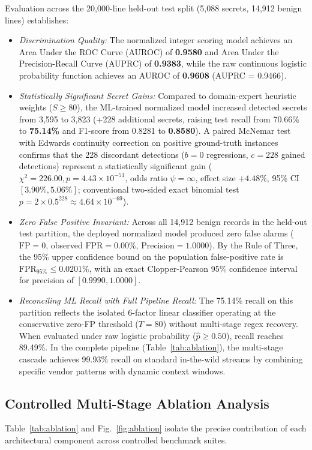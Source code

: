\documentclass[conference]{IEEEtran}
\begin{document}
Evaluation across the 20,000-line held-out test split (5,088 secrets, 14,912 benign lines) establishes:
\begin{itemize}
    \item \textit{Discrimination Quality:} The normalized integer scoring model achieves an Area Under the ROC Curve (AUROC) of \textbf{0.9580} and Area Under the Precision-Recall Curve (AUPRC) of \textbf{0.9383}, while the raw continuous logistic probability function achieves an AUROC of \textbf{0.9608} (AUPRC = 0.9466).
    \item \textit{Statistically Significant Secret Gains:} Compared to domain-expert heuristic weights ($S \ge 80$), the ML-trained normalized model increased detected secrets from 3,595 to 3,823 (+228 additional secrets, raising test recall from 70.66\% to \textbf{75.14\%} and F1-score from 0.8281 to \textbf{0.8580}). A paired McNemar test with Edwards continuity correction on positive ground-truth instances confirms that the 228 discordant detections ($b=0$ regressions, $c=228$ gained detections) represent a statistically significant gain ($\chi^2 = 226.00, p = 4.43 \times 10^{-51}$, odds ratio $\psi = \infty$, effect size $+4.48\%$, 95\% CI $[3.90\%, 5.06\%]$; conventional two-sided exact binomial test $p = 2 \times 0.5^{228} \approx 4.64 \times 10^{-69}$).
    \item \textit{Zero False Positive Invariant:} Across all 14,912 benign records in the held-out test partition, the deployed normalized model produced zero false alarms ($\text{FP} = 0$, observed $\text{FPR} = 0.00\%$, $\text{Precision} = 1.0000$). By the Rule of Three, the 95\% upper confidence bound on the population false-positive rate is $\text{FPR}_{95\%} \le 0.0201\%$, with an exact Clopper-Pearson 95\% confidence interval for precision of $[0.9990, 1.0000]$.
    \item \textit{Reconciling ML Recall with Full Pipeline Recall:} The 75.14\% recall on this partition reflects the isolated 6-factor linear classifier operating at the conservative zero-FP threshold ($T=80$) without multi-stage regex recovery. When evaluated under raw logistic probability ($\hat{p} \ge 0.50$), recall reaches 89.49\%. In the complete pipeline (Table~\ref{tab:ablation}), the multi-stage cascade achieves 99.93\% recall on standard in-the-wild streams by combining specific vendor patterns with dynamic context windows.
\end{itemize}

\subsection{Controlled Multi-Stage Ablation Analysis}\label{sec:ablation}
Table~\ref{tab:ablation} and Fig.~\ref{fig:ablation} isolate the precise contribution of each architectural component across controlled benchmark suites.
\end{document}
